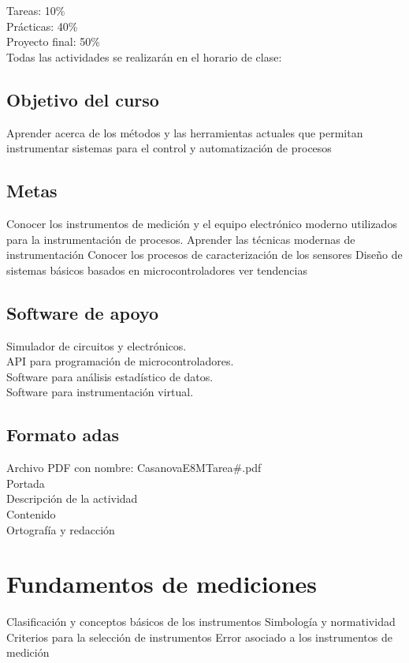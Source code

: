 \documentclass[11pt]{report}
\theoremstyle{plain}
\theoremstyle{definition}
\begin{document}
Tareas: 10\% \\
Prácticas: 40\% \\
Proyecto final: 50\% \\

Todas las actividades se realizarán en el horario de clase:

\section{Objetivo del curso}
Aprender acerca de los métodos y las herramientas actuales que permitan instrumentar sistemas para el control y automatización de procesos

\section{Metas}
Conocer los instrumentos de medición y el equipo electrónico moderno utilizados para la instrumentación de procesos.
Aprender las técnicas modernas de instrumentación
Conocer los procesos de caracterización de los sensores
Diseño de sistemas básicos basados en microcontroladores
ver tendencias 


\section{Software de apoyo}
Simulador de circuitos y electrónicos.\\
API para programación de microcontroladores.\\
Software para análisis estadístico de datos.\\
Software para instrumentación virtual.


\section{Formato adas}
Archivo PDF con nombre: CasanovaE8MTarea\#.pdf \\
Portada \\
Descripción de la actividad \\
Contenido \\
Ortografía y redacción\\


\chapter{Fundamentos de mediciones}
Clasificación y conceptos básicos de los instrumentos
Simbología y normatividad
Criterios para la selección de instrumentos
Error asociado a los instrumentos de medición
\end{document}
